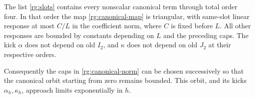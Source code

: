 \begin{lemma}
\label{rg:canonical-contraction}
The list \eqref{rg:slots} contains every nonscalar canonical term
through total order four.  In that order the map
\eqref{rg:canonical-map} is triangular, with same-slot linear
response at most $C/L$ in the coefficient norm, where $C$ is fixed
before $L$.  All other responses are bounded by constants depending
on $L$ and the preceding caps.  The kick $\alpha$ does not depend
on old $I_2$, and $\kappa$ does not depend on old $J_2$ at their
respective orders.

Consequently the caps in \eqref{rg:canonical-norm} can be chosen
successively so that the canonical orbit starting from zero remains
bounded.  This orbit, and its kicks $\alpha_h,\kappa_h$, approach
limits exponentially in $h$.
\end{lemma}
